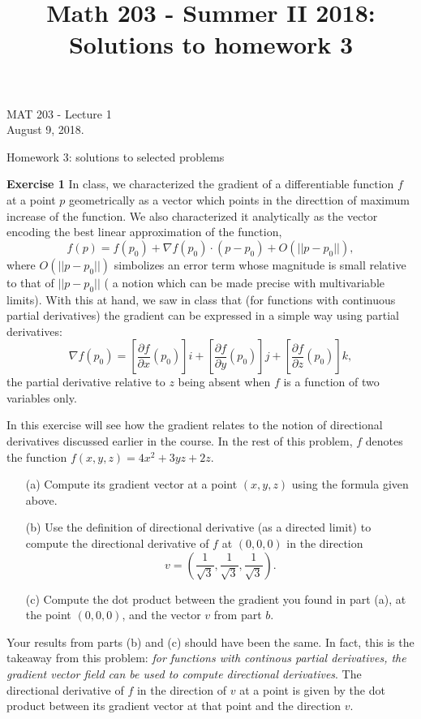 \documentclass[12pt,oneside]{exam}
\title{Math 203 - Summer II 2018: Solutions to homework 3}
\newenvironment{exercise}[1]{\vspace{.1in}\noindent\textbf{Exercise #1 \hspace{.05em}}}{}
\begin{document}
\begin{flushright}
\sc MAT 203 - Lecture 1\\
August 9, 2018.
\end{flushright}
\bigskip

\begin{center}
\textsf{Homework 3: solutions to selected problems} 
\end{center}

\begin{exercise}{1}
In class, we characterized the gradient of a differentiable function $f$ at a point $p$ geometrically as a vector which points in the directtion of maximum increase of the function. We also characterized it analytically as the vector encoding the best linear approximation of the function, 
\begin{equation*}
f(p)=f(p_0)+\nabla f(p_0) \cdot (p-p_0) + O(||p-p_0||), 
\end{equation*}
where $O(||p-p_0||)$ simbolizes an error term whose magnitude is small relative to that of $||p-p_0||$ ( a notion which can be made precise with multivariable limits). With this at hand, we saw in class that (for functions with continuous partial derivatives) the gradient can be expressed in a simple way using partial derivatives:
\begin{equation}\label{gradient}
\nabla f(p_0) = \left[\frac{\partial f}{\partial x} (p_0)\right]i + \left[\frac{\partial f}{\partial y} (p_0)\right] j  + \left[\frac{\partial f}{\partial z} (p_0)\right] k,
\end{equation}
the partial derivative relative to $z$ being absent when $f$ is a function of two variables only. 

In this exercise will see how the gradient relates to the notion of directional derivatives discussed earlier in the course. In the rest of this problem, $f$ denotes the function $f(x,y,z)=4x^2+3yz+2z$. 

\begin{itemize}
\item[(a)] Compute its gradient vector at a point $(x,y,z)$ using the formula given above. 
\item[(b)] Use the definition of directional derivative (as a directed limit) to compute the directional derivative of $f$ at $(0,0,0)$ in the direction 
\begin{equation*}
v=\left(\frac{1}{\sqrt 3}, \frac{1}{\sqrt 3},\frac{1}{\sqrt 3}\right).
\end{equation*}
\item[(c)] Compute the dot product between the gradient you found in part (a), at the point $(0,0,0)$, and the vector $v$ from part $b$. 
\end{itemize}

Your results from parts (b) and (c) should have been the same. In fact, this is the takeaway from this problem: \textit{for functions with continous partial derivatives, the gradient vector field can be used to compute directional derivatives}. The directional derivative of $f$ in the direction of $v$ at a point is given by the dot product between its gradient vector at that point and the direction $v$. 
\end{exercise}
\end{document}
